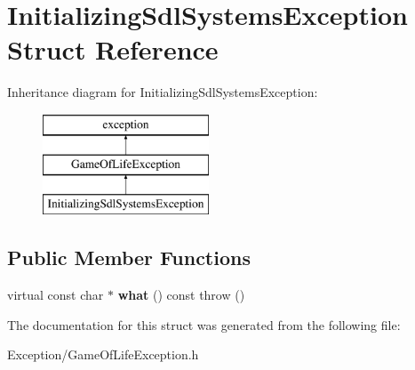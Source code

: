\hypertarget{struct_initializing_sdl_systems_exception}{}\section{Initializing\+Sdl\+Systems\+Exception Struct Reference}
\label{struct_initializing_sdl_systems_exception}
Inheritance diagram for Initializing\+Sdl\+Systems\+Exception\+:\begin{figure}[H]
\begin{center}
\leavevmode
\includegraphics[height=3.000000cm]{struct_initializing_sdl_systems_exception}
\end{center}
\end{figure}
\subsection*{Public Member Functions}
\begin{DoxyCompactItemize}
\item 
\hypertarget{struct_initializing_sdl_systems_exception_afa37b264bbe9c5876da14a22c5d47400}{}virtual const char $\ast$ {\bfseries what} () const   throw ()\label{struct_initializing_sdl_systems_exception_afa37b264bbe9c5876da14a22c5d47400}

\end{DoxyCompactItemize}


The documentation for this struct was generated from the following file\+:\begin{DoxyCompactItemize}
\item 
Exception/Game\+Of\+Life\+Exception.\+h\end{DoxyCompactItemize}
